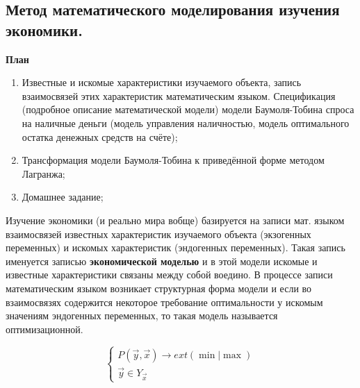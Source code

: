 \documentclass[12pt,a4paper]{article}
\author{Аверьянов Т.С.}
\begin{document}
\begin{center}
\section*{Метод математического моделирования изучения экономики.}
\end{center}

\begin{center}
\large{\textbf{План}}
\end{center}
\begin{enumerate}
\item Известные и искомые характеристики изучаемого объекта, запись взаимосвязей этих характеристик математическим языком. Спецификация (подробное описание математической модели) модели Баумоля-Тобина спроса на наличные деньги (модель управления наличностью, модель оптимального остатка денежных средств на счёте);
\item Трансформация модели Баумоля-Тобина к приведённой форме методом Лагранжа;
\item Домашнее задание;
\end{enumerate}

Изучение экономики (и реально мира вобще) базируется на записи мат. языком взаимосвязей известных характеристик изучаемого объекта (экзогенных переменных) и искомых характеристик (эндогенных переменных). Такая запись именуется записью \textbf{экономической моделью} и в этой модели искомые и известные характеристики связаны между собой воедино. В процессе записи математическим языком возникает структурная форма модели и если во взаимосвязях содержится некоторое требование оптимальности у искомым значениям эндогенных переменных, то такая модель называется оптимизационной.

\begin{equation}
 \begin{cases}
   P(\vec{y}, \vec{x}) \rightarrow ext (\min |  \max) \\
   \vec{y} \in Y_{\vec{x}}
 \end{cases}
\end{equation}
\end{document}
